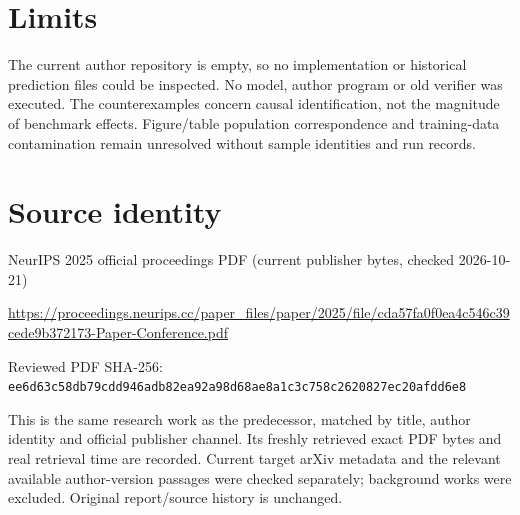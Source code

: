 \documentclass[11pt]{article}
\begin{document}
\section*{Limits}

The current author repository is empty, so no implementation or historical prediction files could be inspected. No model, author program or old verifier was executed. The counterexamples concern causal identification, not the magnitude of benchmark effects. Figure/table population correspondence and training-data contamination remain unresolved without sample identities and run records.\par

\section*{Source identity}

NeurIPS 2025 official proceedings PDF (current publisher bytes, checked 2026-10-21)

\url{https://proceedings.neurips.cc/paper_files/paper/2025/file/cda57fa0f0ea4c546c39cede9b372173-Paper-Conference.pdf}

Reviewed PDF SHA-256: \nolinkurl{ee6d63c58db79cdd946adb82ea92a98d68ae8a1c3c758c2620827ec20afdd6e8}

This is the same research work as the predecessor, matched by title, author identity and official publisher channel. Its freshly retrieved exact PDF bytes and real retrieval time are recorded. Current target arXiv metadata and the relevant available author-version passages were checked separately; background works were excluded. Original report/source history is unchanged.
\end{document}

